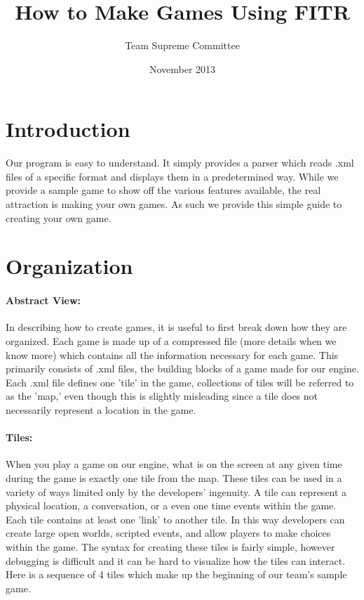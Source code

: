 \documentclass[11pt]{article}
\begin{document}
\lstset{language=XML}
\title{How to Make Games Using FITR}
\author{Team Supreme Committee}
\date{November 2013}
\maketitle

\section{Introduction}

Our program is easy to understand. It simply provides a parser which reads .xml files of a specific format and displays them in a predetermined way. While we provide a sample game to show off the various features available, the real attraction is making your own games. As such we provide this simple guide to creating your own game.


\section{Organization}

\paragraph{Abstract View:}

In describing how to create games, it is useful to first break down how they are organized. Each game is made up of a compressed file (more details when we know more) which contains all the information necessary for each game. This primarily consists of .xml files, the building blocks of a game made for our engine. Each .xml file defines one 'tile' in the game, collections of tiles will be referred to as the 'map,' even though this is slightly misleading since a tile does not necessarily represent a location in the game.

\paragraph{Tiles:}

When you play a game on our engine, what is on the screen at any given time during the game is exactly one tile from the map. These tiles can be used in a variety of ways limited only by the developers' ingenuity. A tile can represent a physical location, a conversation, or a even one time events within the game. Each tile contains at least one 'link' to another tile. In this way developers can create large open worlds, scripted events, and allow players to make choices within the game. The syntax for creating these tiles is fairly simple, however debugging is difficult and it can be hard to visualize how the tiles can interact. Here is a sequence of 4 tiles which make up the beginning of our team's sample game.
\end{document}
